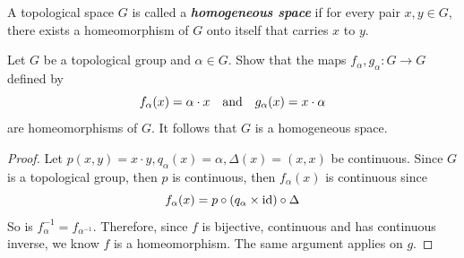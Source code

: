 \documentclass[12pt,a4paper]{article}
\begin{document}
    \begin{ex}\label{2.11.4}
        A topological space $G$ is called a \textbf{\textit{homogeneous space}} if for every pair $x,y\in G$, there exists a homeomorphism of $G$ onto itself that carries $x$ to $y$. 

        Let $G$ be a topological group and $\alpha\in G$. Show that the maps $f_\alpha,g_\alpha:G\to G$ defined by
        $$
        f_\alpha(x)=\alpha\cdot x\quad\text{and}\quad g_\alpha(x)=x\cdot\alpha
        $$
        are homeomorphisms of $G$. It follows that $G$ is a homogeneous space.
    \end{ex}
    \begin{proof}
        Let $p(x,y)=x\cdot y, q_\alpha(x)=\alpha, \Delta(x)=(x,x)$ be continuous. Since $G$ is a topological group, then $p$ is continuous, then $f_\alpha(x)$ is continuous since
        $$
        f_\alpha(x)=p\circ(q_\alpha\times\operatorname{id})\circ\Delta
        $$
        So is $f_\alpha^{-1}=f_{\alpha^{-1}}$. Therefore, since $f$ is bijective, continuous and has continuous inverse, we know $f$ is a homeomorphism. The same argument applies on $g$.
    \end{proof}
    \hfill
\end{document}
